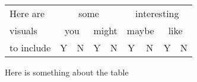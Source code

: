 \begin{figure*}[ht]

\centering
\begin{tabular}{p{}|cccc|cccc|}
\cline{2-9}
Here are & \multicolumn{4}{c|}{some} & \multicolumn{4}{c|}{interesting} \\ \cline{2-9} 
visuals & \multicolumn{2}{c|}{you} & \multicolumn{2}{c|}{might} & \multicolumn{2}{c|}{maybe} & \multicolumn{2}{c|}{like} \\ \cline{2-9} 
to include & \multicolumn{1}{c|}{Y} & \multicolumn{1}{c|}{N} & \multicolumn{1}{c|}{Y} & N & \multicolumn{1}{c|}{Y} & \multicolumn{1}{c|}{N} & \multicolumn{1}{c|}{Y} & N \\ \cline{2-9} 
\end{tabular}
\caption[A Table]{
Here is something about the table}
\label{tab:chair}
\end{figure*}